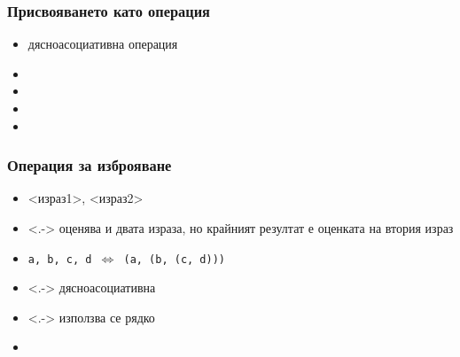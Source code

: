 \documentclass[alsotrans]{beamerswitch}
\begin{document}
\begin{frame}
  \frametitle{Присвояването като операция}
  \begin{fixedarea}[.6]
    \begin{itemize}
    \item<1-> \alert{дясноасоциативна} операция
    \item<2-> 
    \item<3> 
    \item<5-> \exa {}
    \item<6-> \exa {}
    \end{itemize}
  \end{fixedarea}
\end{frame}

\begin{frame}
  \frametitle{Операция за изброяване}

  \begin{itemize}[<+->]
  \item{} <израз1>\tta, <израз2>
  \item<.-> оценява и двата израза, но крайният резултат е оценката на втория израз
  \item \tt{a, b, c, d} $\Leftrightarrow$ \tt{(a, (b, (c, d)))}
  \item<.-> \alert{дясноасоциативна}
  \item<.-> използва се рядко
  \item \exa {}
  \end{itemize}
\end{frame}
\end{document}
